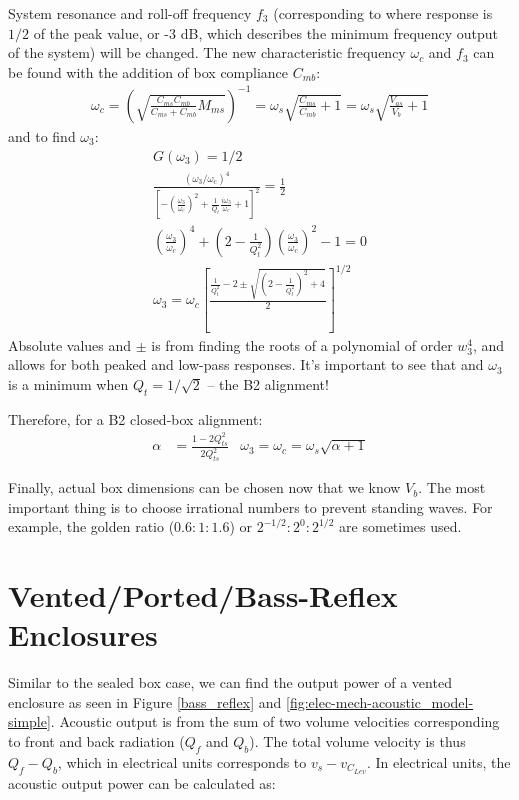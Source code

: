 \documentclass[10pt]{book}
\begin{document}
System resonance and roll-off frequency $f_3$ (corresponding to where response is $1/2$ of the peak value, or -3 dB, which describes the minimum frequency output of the system) will be changed. The new characteristic frequency $\omega_c$ and $f_3$ can be found with the addition of box compliance $C_{mb}$:
\begin{align}
\omega_c=\left( \sqrt{\frac{C_{ms}C_{mb}}{C_{ms}+C_{mb}}M_{ms}}  \right)^{-1}=\omega_s\sqrt{\frac{C_{ms}}{C_{mb}}+1}=\omega_s\sqrt{\frac{V_{as}}{V_{b}}+1}
\end{align}
and to find $\omega_3$:
\begin{align}
G(\omega_3)=1/2\\
\frac{(\omega_3/\omega_c )^4}{
\left[ -\left( \frac{\omega_3}{\omega_c} \right)^2 +\frac{1}{Q_t}\frac{i\omega_3}{\omega_c}+1\right]^{2}} = \frac{1}{2}\\
\left( \frac{\omega_3}{\omega_c} \right)^4 +\left( 2 -\frac{1}{Q_t^2}\right)\left(\frac{\omega_3}{\omega_c} \right)^2-1=0\\
\omega_3=\omega_c \left[ \frac{  \frac{1}{Q_{t}^2}-2  \pm \sqrt{\left( 2- \frac{1}{Q_{t}^2}\right)^2+4}}{2}\right]^{1/2}
\end{align}
Absolute values and $\pm$ is from finding the roots of a polynomial of order $w_3^4$, and allows for both peaked and low-pass responses. It's important to see that and $\omega_3$ is a minimum when $Q_t=1/\sqrt{2}$ -- the B2 alignment!

Therefore, for a B2 closed-box alignment:
\begin{align}
\alpha&=\frac{1-2 Q_{ts}^2}{2 Q_{ts}^2} & \omega_3=\omega_c=\omega_s\sqrt{\alpha+1}
\end{align}

Finally, actual box dimensions can be chosen now that we know $V_b$. The most important thing is to choose irrational numbers to prevent standing waves. For example, the golden ratio ($0.6:1:1.6$) or ${2}^{-1/2}:{2}^{0}:{2}^{1/2}$ are sometimes used.

\section{Vented/Ported/Bass-Reflex Enclosures} Similar to the sealed box case, we can find the output power of a vented enclosure as seen in Figure \ref{bass_reflex} and \ref{fig:elec-mech-acoustic_model-simple}. Acoustic output is from the sum of two volume velocities corresponding to front and back radiation ($Q_f$ and $Q_b$). The total volume velocity is thus $Q_f-Q_b$, which in electrical units corresponds to  $v_s-v_{C_{Lev}}$. In electrical units, the acoustic output power can be calculated as:
\end{document}
